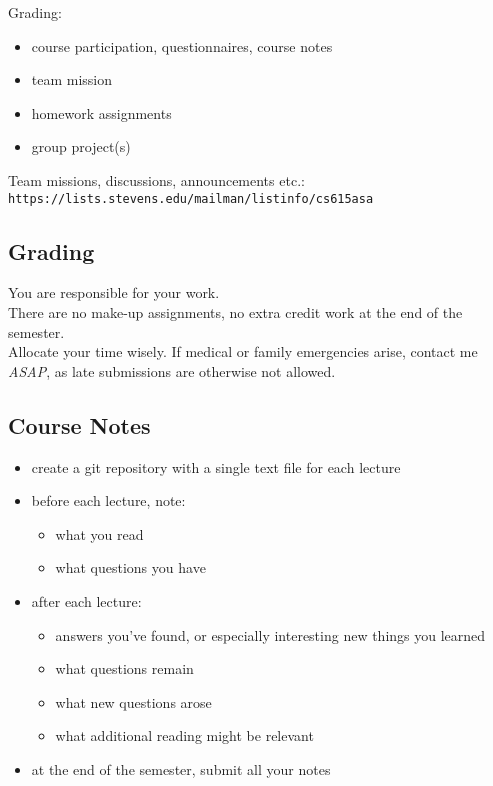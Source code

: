 \documentclass[xga]{xdvislides}
\begin{document}
Grading:
\begin{itemize}
	\item course participation, questionnaires, course notes
	\item team mission
	\item homework assignments
	\item group project(s)
\end{itemize}
\vspace{.5in}

Team missions, discussions, announcements etc.: \\
\verb+https://lists.stevens.edu/mailman/listinfo/cs615asa+


\subsection{Grading}
You are responsible for your work. \\

There are no make-up assignments, no extra credit work
at the end of the semester. \\

Allocate your time wisely.  If medical or family
emergencies arise, contact me {\em ASAP}, as late
submissions are otherwise not allowed.

\subsection{Course Notes}
\begin{itemize}
	\item create a git repository with a single text file for each lecture
	\item before each lecture, note:
		\begin{itemize}
			\item what you read
			\item what questions you have
		\end{itemize}
	\item after each lecture:
		\begin{itemize}
			\item answers you've found, or especially interesting new things you learned
			\item what questions remain
			\item what new questions arose
			\item what additional reading might be relevant
		\end{itemize}
	\item at the end of the semester, submit all your notes
\end{itemize}
\end{document}

